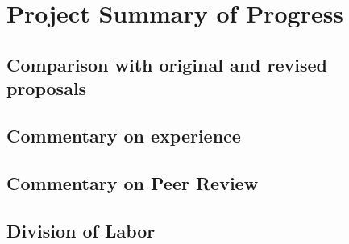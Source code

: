 \documentclass[10pt]{article}
\begin{document}
\section{Project Summary of Progress}
\subsection{Comparison with original and revised proposals}
\subsection{Commentary on experience}
\subsection{Commentary on Peer Review}
\subsection{Division of Labor}
\end{document}
